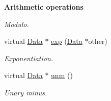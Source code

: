 \begin{Indent}{\bf Arithmetic operations}
\begin{DoxyCompactItemize}
\begin{DoxyCompactList}\small\item\em Modulo. \end{DoxyCompactList}\item 
virtual \hyperlink{classcreek_1_1_data}{Data} $\ast$ \hyperlink{classcreek_1_1_data_a3fafe5e71dcd3a59bc6c17f3dc5d3c46}{exp} (\hyperlink{classcreek_1_1_data}{Data} $\ast$other)\hypertarget{classcreek_1_1_data_a3fafe5e71dcd3a59bc6c17f3dc5d3c46}{}\label{classcreek_1_1_data_a3fafe5e71dcd3a59bc6c17f3dc5d3c46}

\begin{DoxyCompactList}\small\item\em Exponentiation. \end{DoxyCompactList}\item 
virtual \hyperlink{classcreek_1_1_data}{Data} $\ast$ \hyperlink{classcreek_1_1_data_ac8b2399481479c8b13a465bfaa9a3beb}{unm} ()\hypertarget{classcreek_1_1_data_ac8b2399481479c8b13a465bfaa9a3beb}{}\label{classcreek_1_1_data_ac8b2399481479c8b13a465bfaa9a3beb}

\begin{DoxyCompactList}\small\item\em Unary minus. \end{DoxyCompactList}\end{DoxyCompactItemize}
\end{Indent}
